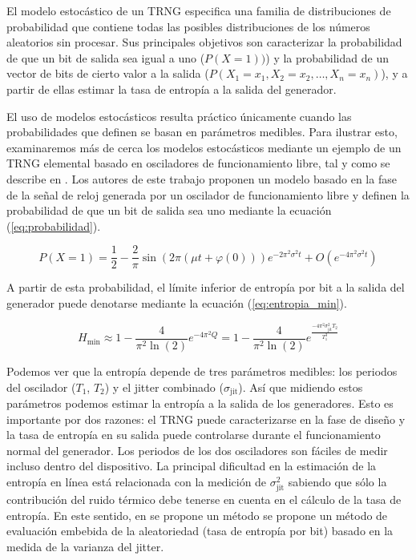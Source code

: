             El modelo estocástico de un TRNG especifica una familia de distribuciones de probabilidad que contiene todas las posibles distribuciones de los números aleatorios sin procesar. Sus principales objetivos son caracterizar la probabilidad de que un bit de salida sea igual a uno ($P(X = 1))$) y la probabilidad de un vector de bits de cierto valor a la salida ($P(X_1 = x_1, X_2 = x_2, \ldots, X_n = x_n)$), y a partir de ellas estimar la tasa de entropía a la salida del generador.

            El uso de modelos estocásticos resulta práctico únicamente cuando las probabilidades que definen se basan en parámetros medibles. Para ilustrar esto, examinaremos más de cerca los modelos estocásticos mediante un ejemplo de un TRNG elemental basado en osciladores de funcionamiento libre, tal y como se describe en \cite{Baudet2010}. Los autores de este trabajo proponen un modelo basado en la fase de la señal de reloj generada por un oscilador de funcionamiento libre y definen la probabilidad de que un bit de salida sea uno mediante la ecuación (\ref{eq:probabilidad}).

            \begin{equation}
                P(X=1) = \frac{1}{2} - \frac{2}{\pi} \sin (2 \pi (\mu t + \varphi(0) ) ) e^{-2\pi^{2} \sigma^{2} t} + O(e^{-4\pi^{2} \sigma^{2} t})
                \label{eq:probabilidad}
            \end{equation}

            A partir de esta probabilidad, el límite inferior de entropía por bit a la salida del generador puede denotarse mediante la ecuación (\ref{eq:entropia_min}).

            \begin{equation}
                H_{\text{min}} \approx 1 - \frac{4}{\pi^{2} \ln (2)} e^{-4 \pi ^{2} Q} = 1 - \frac{4}{\pi^{2} \ln (2)} e^{ \frac{-4\pi^{2} \sigma_{\text{jit}}^{2} T_{2} }{T_{1}^{3}} }
                \label{eq:entropia_min}
            \end{equation}
            
            Podemos ver que la entropía depende de tres parámetros medibles: los periodos del oscilador ($T_{1}$, $T_{2}$) y el jitter combinado ($\sigma_{\text{jit}}$). Así que midiendo estos parámetros podemos estimar la entropía a la salida de los generadores. Esto es importante por dos razones: el TRNG puede caracterizarse en la fase de diseño y la tasa de entropía en su salida puede controlarse durante el funcionamiento normal del generador. Los periodos de los dos osciladores son fáciles de medir incluso dentro del dispositivo. La principal dificultad en la estimación de la entropía en línea está relacionada con la medición de $\sigma_{\text{jit}}^{2}$ sabiendo que sólo la contribución del ruido térmico debe tenerse en cuenta en el cálculo de la tasa de entropía. En este sentido, en \cite{Fischer2014} se propone un método se propone un método de evaluación embebida de la aleatoriedad (tasa de entropía por bit) basado en la medida de la varianza del jitter.


